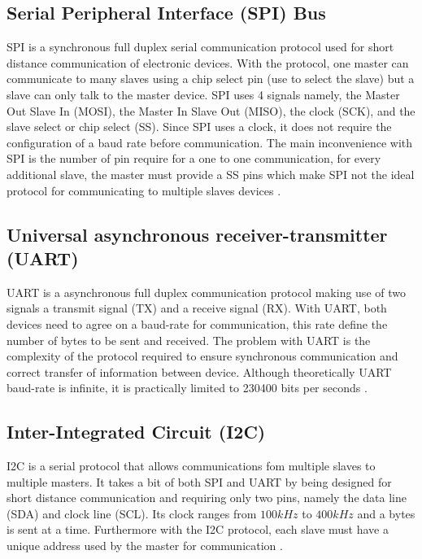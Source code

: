 \subsection{Serial Peripheral Interface (SPI) Bus}
SPI is a synchronous full duplex serial communication protocol used for short distance communication of electronic devices. With the protocol, one master can communicate to many slaves using a chip select pin (use to select the slave) but a slave can only talk to the master device. SPI uses 4 signals namely, the Master Out Slave In (MOSI), the Master In Slave Out (MISO), the clock (SCK), and the slave select or chip select (SS). Since SPI uses a clock, it does not require the configuration of a baud rate before communication. The main inconvenience with SPI is the number of pin require for a one to one communication, for every additional slave, the master must provide a SS pins which make SPI not the ideal protocol for communicating to multiple slaves devices \cite{spi}. 
\subsection{Universal asynchronous receiver-transmitter (UART)}
UART is a asynchronous full duplex communication protocol making use of two signals a transmit signal (TX) and a receive signal (RX). With UART, both devices need to agree on a baud-rate for communication, this rate define the number of bytes to be sent and received. The problem with UART is the complexity of the protocol required to ensure synchronous communication and correct transfer of information between device. Although theoretically UART baud-rate is infinite, it is practically limited to 230400 bits per seconds \cite{uart}.   
\subsection{Inter-Integrated Circuit (I2C)}
I2C is a serial protocol that allows communications fom multiple slaves to multiple masters. It takes a bit of both SPI and UART by being designed for short distance communication and requiring only two pins, namely the data line (SDA) and clock line (SCL). Its clock ranges from $100kHz$ to $400kHz$ and a bytes is sent at a time. Furthermore with the I2C protocol, each slave must have a unique address used by the master for communication \cite{i2c}.  
